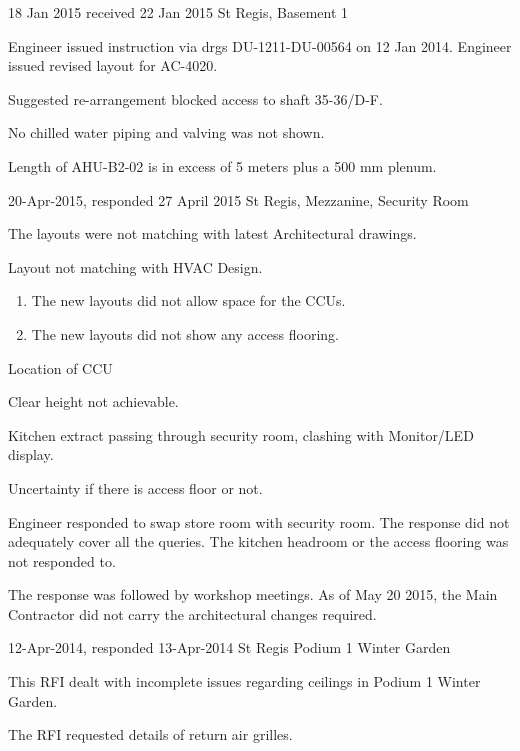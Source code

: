  {18 Jan 2015 received 22 Jan 2015} {St Regis, Basement 1}%
 {
   \item Engineer issued instruction via drgs DU-1211-DU-00564 on 12 Jan 2014. 
    Engineer issued revised layout for AC-4020.
   \item Suggested re-arrangement blocked access to shaft 35-36/D-F.
   \item No chilled water piping and valving was not shown.
   \item Length of AHU-B2-02 is in excess of 5 meters plus a 500 mm plenum. 
 }



{20-Apr-2015, responded 27 April 2015} {St Regis, Mezzanine, Security Room} 
{

\item The layouts were not matching with latest Architectural drawings.
\item Layout not matching with HVAC Design.
        \begin{enumerate}
        \item The new layouts did not allow space for the CCUs.
        \item The new layouts did not show any access flooring.
        \end{enumerate}
\item Location of CCU 
\item Clear height not achievable.
\item Kitchen extract passing through security room, clashing with Monitor/LED display.
\item Uncertainty if there is access floor or not.
\item Engineer responded to swap store room with security room. The response did not adequately cover all the 
queries. The kitchen headroom or the access flooring was not responded to.
\item The response was followed by workshop meetings. As of May 20 2015, the Main Contractor did not carry the architectural changes required. \delay\delay\delay
}


 {12-Apr-2014, responded 13-Apr-2014} {St Regis Podium 1 Winter Garden} 
{
\item This RFI dealt with incomplete issues regarding ceilings in Podium 1 Winter Garden.
\item The RFI requested details of return air grilles.
}


